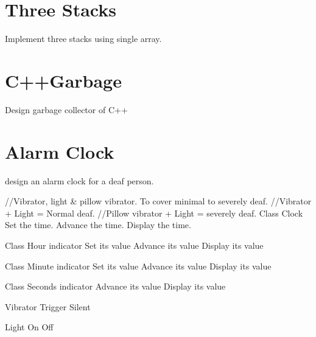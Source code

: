 \section{Three Stacks}
 Implement three stacks using single array.

 \section{C++Garbage}
 Design garbage collector of C++

 \section{Alarm Clock}
 design an alarm clock for a deaf person.

 \begin{Code}
 	//Vibrator, light \& pillow vibrator. To cover minimal to severely deaf.
 	//Vibrator + Light = Normal deaf.
 	//Pillow vibrator + Light = severely deaf.
 	Class Clock
	 	Set the time.
	 	Advance the time.
	 	Display the time.
 	
 	Class Hour indicator
	 	Set its value
	 	Advance its value
	 	Display its value
 	
 	Class Minute indicator
	 	Set its value
	 	Advance its value
	 	Display its value
 	
 	Class Seconds indicator
	 	Advance its value
	 	Display its value
 	
 	Vibrator
	 	Trigger
	 	Silent
 	
 	Light
	 	On
	 	Off
 \end{Code} 